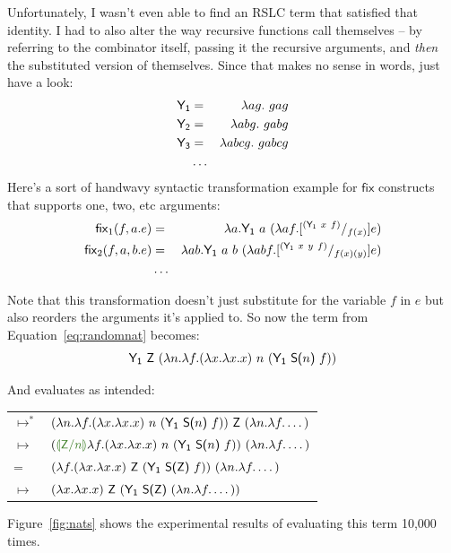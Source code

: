 \documentclass[10pt]{sigplanconf}
\begin{document}
Unfortunately, I wasn't even able to find an RSLC term that satisfied that identity. I had to also alter the way recursive functions call themselves -- by referring to the combinator itself, passing it the recursive arguments, and {\em then} the substituted version of themselves. Since that makes no sense in words, just have a look:
\begin{eqnarray*}
\mathsf{Y_1} &=& \lambda ag.~gag \\
\mathsf{Y_2} &=& \lambda abg.~gabg \\
\mathsf{Y_3} &=& \lambda abcg.~gabcg \\
&\dots&
\end{eqnarray*}
Here's a sort of handwavy syntactic transformation example for $\mathsf{fix}$ constructs that supports one, two, etc arguments:
\begin{eqnarray*}
\mathsf{fix}_1(f,a.e) &=& \lambda a. \mathsf{Y_1}~a~(\lambda af. [^{(\mathsf{Y_1}~x~f)}/_{f(x)}]e) \\
\mathsf{fix}_2(f,a,b.e) &=& \lambda ab. \mathsf{Y_1}~a~b~(\lambda abf. [^{(\mathsf{Y_1}~x~y~f)}/_{f(x)(y)}]e) \\
&\dots&
\end{eqnarray*}

Note that this transformation doesn't just substitute for the variable $f$ in $e$ but also reorders the arguments it's applied to. So now the term from Equation~\ref{eq:randomnat} becomes:
\begin{equation}
\label{eq:randomnat-fixed}
\mathsf{Y_1}~\textsf{Z}~(\lambda n. \lambda f. (\lambda x. \lambda x. x)~n~(\mathsf{Y_1}~\textsf{S(}n\textsf{)}~f))
\end{equation}

And evaluates as intended:

\begin{center}
\begin{tabular}{ll}
$\mapsto^*$ & $(\lambda n. \lambda f. (\lambda x. \lambda x. x)~n~(\mathsf{Y_1}~\textsf{S(}n\textsf{)}~f))~\textsf{Z}~(\lambda n. \lambda f. \dots)$ \\
$\mapsto$ & $(\subst{\Zero}{n}\lambda f. (\lambda x. \lambda x. x)~n~(\Ya~\Suc{n}~f))~(\lambda n. \lambda f. \dots)$ \\
= & $(\lambda f. (\lambda x. \lambda x. x)~\textsf{Z}~(\mathsf{Y_1}~\textsf{S(}\textsf{Z}\textsf{)}~f))~(\lambda n. \lambda f. \dots)$ \\
$\mapsto$ & $(\lambda x. \lambda x. x)~\textsf{Z}~(\mathsf{Y_1}~\textsf{S(}\textsf{Z}\textsf{)}~(\lambda n. \lambda f. \dots))$
\end{tabular}
\end{center}

Figure~\ref{fig:nats} shows the experimental results of evaluating this term 10,000 times.
\end{document}

